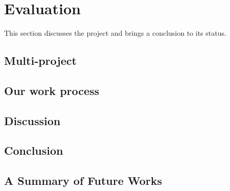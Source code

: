 \chapter{Evaluation}\label{chap:evaluation}
This section discusses the project and brings a conclusion to its status.

\section{Multi-project}\label{sec:eval:multiproject}


\section{Our work process}\label{sec:eval:us}


\section{Discussion}\label{sec:eval:discussion}


\section{Conclusion}


\section{A Summary of Future Works}
